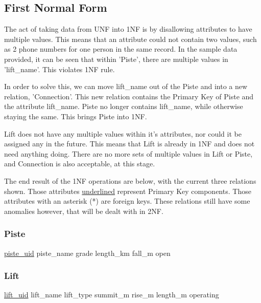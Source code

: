\documentclass[11pt]{scrartcl} %
\begin{document}
\subsection{First Normal Form}
The act of taking data from UNF into 1NF is by disallowing attributes to have multiple values. This means that an attribute could not contain two values, such as 2 phone numbers for one person in the same record. In the sample data provided, it can be seen that within 'Piste', there are multiple values in 'lift\_name'. This violates 1NF rule.

In order to solve this, we can move lift\_name out of the Piste and into a new relation, 'Connection'. This new relation contains the Primary Key of Piste and the attribute lift\_name. Piste no longer contains lift\_name, while otherwise staying the same. This brings Piste into 1NF.

Lift does not have any multiple values within it's attributes, nor could it be assigned any in the future. This means that Lift is already in 1NF and does not need anything doing. There are no more sets of multiple values in Lift or Piste, and Connection is also acceptable, at this stage.

The end result of the 1NF operations are below, with the current three relations shown. Those attributes \underline{underlined} represent Primary Key components. Those attributes with an asterisk (*) are foreign keys. These relations still have some anomalies however, that will be dealt with in 2NF.

\subsubsection{Piste}
\underline{piste\_uid}\newline
piste\_name\newline
grade\newline
length\_km\newline
fall\_m\newline
open

\subsubsection{Lift}
\underline{lift\_uid}\newline
lift\_name\newline
lift\_type\newline
summit\_m\newline
rise\_m\newline
length\_m\newline
operating
\end{document}
